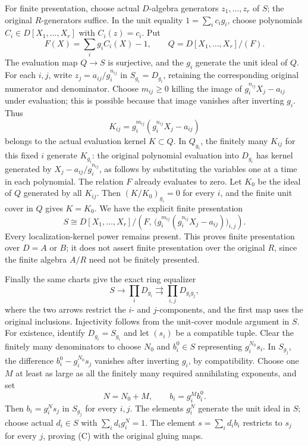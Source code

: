 For finite presentation, choose actual \(D\)-algebra generators \(z_1,\ldots,z_r\) of \(S\); the original \(R\)-generators suffice. In the unit equality \(1=\sum_i c_i g_i\), choose polynomials \(C_i\in D[X_1,\ldots,X_r]\) with \(C_i(z)=c_i\). Put \[
 F(X)=\sum_i g_i C_i(X)-1,\qquad
 Q=D[X_1,\ldots,X_r]/(F).
\] The evaluation map \(Q\to S\) is surjective, and the \(g_i\) generate the unit ideal of \(Q\). For each \(i,j\), write \(z_j=a_{ij}/g_i^{n_{ij}}\) in \(S_{g_i}=D_{g_i}\), retaining the corresponding original numerator and denominator. Choose \(m_{ij}\geq0\) killing the image of \(g_i^{n_{ij}}X_j-a_{ij}\) under evaluation; this is possible because that image vanishes after inverting \(g_i\). Thus \[
 K_{ij}=g_i^{m_{ij}}(g_i^{n_{ij}}X_j-a_{ij})
\] belongs to the actual evaluation kernel \(K\subset Q\). In \(Q_{g_i}\), the finitely many \(K_{ij}\) for this fixed \(i\) generate \(K_{g_i}\): the original polynomial evaluation into \(D_{g_i}\) has kernel generated by \(X_j-a_{ij}/g_i^{n_{ij}}\), as follows by substituting the variables one at a time in each polynomial. The relation \(F\) already evaluates to zero. Let \(K_0\) be the ideal of \(Q\) generated by all \(K_{ij}\). Then \((K/K_0)_{g_i}=0\) for every \(i\), and the finite unit cover in \(Q\) gives \(K=K_0\). We have the explicit finite presentation \[
 S\cong
 D[X_1,\ldots,X_r]\big/
 \left(F,\,
       \bigl(g_i^{m_{ij}}
             (g_i^{n_{ij}}X_j-a_{ij})\bigr)_{i,j}\right).
\] Every localization-kernel power remains present. This proves finite presentation over \(D=A\) or \(B\); it does not assert finite presentation over the original \(R\), since the finite algebra \(A/R\) need not be finitely presented.

Finally the same charts give the exact ring equalizer \[
 S\longrightarrow\prod_iD_{g_i}
       \rightrightarrows\prod_{i,j}D_{g_ig_j},
 \tag{C}
\] where the two arrows restrict the \(i\)- and \(j\)-components, and the first map uses the original inclusions. Injectivity follows from the unit-cover module argument in \(S\). For existence, identify \(D_{g_i}=S_{g_i}\) and let \((s_i)\) be a compatible tuple. Clear the finitely many denominators to choose \(N_0\) and \(b_i^0\in S\) representing \(g_i^{N_0}s_i\). In \(S_{g_j}\), the difference \(b_i^0-g_i^{N_0}s_j\) vanishes after inverting \(g_i\), by compatibility. Choose one \(M\) at least as large as all the finitely many required annihilating exponents, and set \[
 N=N_0+M,\qquad b_i=g_i^M b_i^0.
\] Then \(b_i=g_i^N s_j\) in \(S_{g_j}\) for every \(i,j\). The elements \(g_i^N\) generate the unit ideal in \(S\); choose actual \(d_i\in S\) with \(\sum_i d_i g_i^N=1\). The element \(s=\sum_i d_i b_i\) restricts to \(s_j\) for every \(j\), proving (C) with the original gluing maps.

